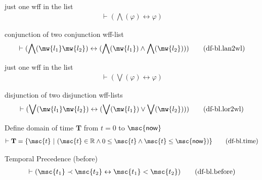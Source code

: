 
\begin{metadefinition} just one wff in the list
\begin{align}
\vdash ( \bigwedge( \varphi ) \leftrightarrow \varphi )\label{eq:df-bl.lan1}\tag{df-bl.lan1}
\end{align}
\end{metadefinition}


\begin{metadefinition} conjunction of two conjunction wff-list
\begin{align}
\vdash ( \bigwedge( \mw{l_1} \mw{l_2} ) \leftrightarrow ( \bigwedge( \mw{l_1} ) \wedge \bigwedge( \mw{l_2} ) ) )\label{eq:df-bl.lan2wl}\tag{df-bl.lan2wl}
\end{align}
\end{metadefinition}


\begin{metadefinition} just one wff in the list
\begin{align}
\vdash ( \bigvee( \varphi ) \leftrightarrow \varphi )\label{eq:df-bl.lor1}\tag{df-bl.lor1}
\end{align}
\end{metadefinition}


\begin{metadefinition} disjunction of two disjunction wff-lists
\begin{align}
\vdash ( \bigvee( \mw{l_1} \mw{l_2} ) \leftrightarrow ( \bigvee( \mw{l_1} ) \vee \bigvee( \mw{l_2} ) ) )\label{eq:df-bl.lor2wl}\tag{df-bl.lor2wl}
\end{align}
\end{metadefinition}


\begin{metadefinition} Define domain of time $\mathbf{T}$ from $t = 0$ to $\mathsf{\msc{now}}$
\begin{align}
\vdash \mathbf{T} = \{ \msc{t} ~\vert~ ( \msc{t} \in \mathbb{R} \wedge 0 \le \msc{t} \wedge \msc{t} \le \mathsf{\msc{now}} ) \}\label{eq:df-bl.time}\tag{df-bl.time}
\end{align}
\end{metadefinition}


\begin{metadefinition} Temporal Precedence (before)
\begin{align}
\vdash ( \msc{t_1} \prec \msc{t_2} \leftrightarrow \msc{t_1} < \msc{t_2} )\label{eq:df-bl.before}\tag{df-bl.before}
\end{align}
\end{metadefinition}


